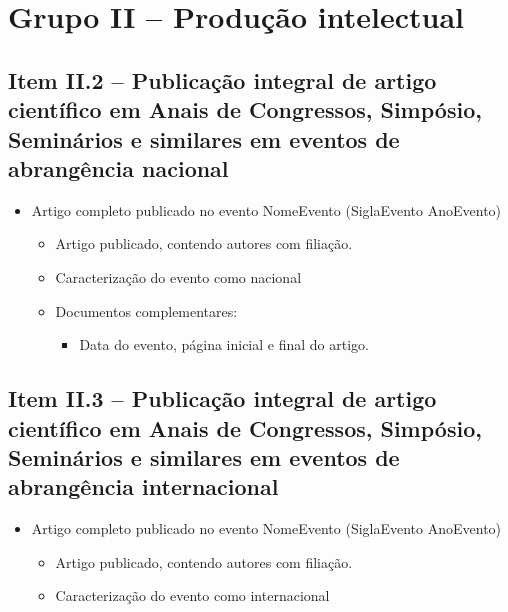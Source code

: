 \section{Grupo II -- Produção intelectual}

\subsection{Item II.2 -- Publicação integral de artigo científico em Anais de Congressos, Simpósio, Seminários e similares em eventos de abrangência nacional}

\begin{itemize}
    \item Artigo completo publicado no evento NomeEvento (SiglaEvento AnoEvento)
    \begin{itemize}
        \item Artigo publicado, contendo autores com filiação.
        
        \item Caracterização do evento como nacional
        
        \item Documentos complementares:
        \begin{itemize}
            \item Data do evento, página inicial e final do artigo.
        \end{itemize}
    \end{itemize}
\end{itemize}

\subsection{Item II.3 -- Publicação integral de artigo científico em Anais de Congressos, Simpósio, Seminários e similares em eventos de abrangência internacional}

\begin{itemize}
    \item Artigo completo publicado no evento NomeEvento (SiglaEvento AnoEvento)
    \begin{itemize}
        \item Artigo publicado, contendo autores com filiação.
        
        \item Caracterização do evento como internacional
    \end{itemize}
\end{itemize}


